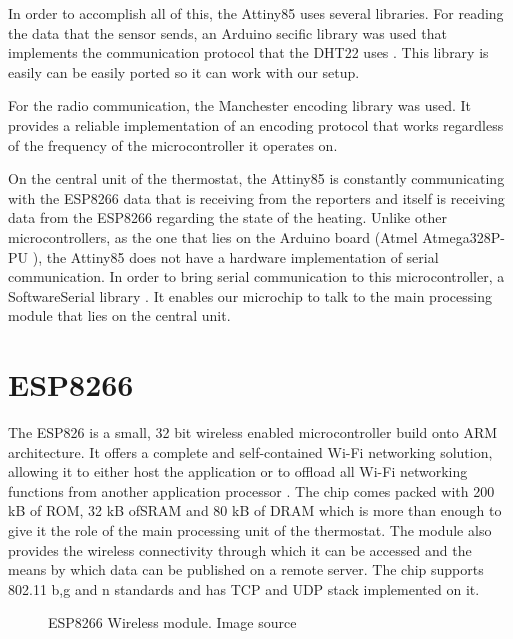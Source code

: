 In order to accomplish all of this, the Attiny85 uses several libraries.
For reading the data that the sensor sends, an Arduino secific library was used that implements the
communication protocol that the DHT22 uses \cite{website:dht22_library}. This library is easily can be easily
ported so it can work with our setup.

For the radio communication, the Manchester encoding library \cite{website:manchester} was used. It provides
a reliable implementation of an encoding protocol that works regardless of the frequency of the
microcontroller it operates on.

On the central unit of the thermostat, the Attiny85 is constantly communicating with the ESP8266 data that is
receiving from the reporters and itself is receiving data from the ESP8266 regarding the state of the heating.
Unlike other microcontrollers, as the one that lies on the Arduino board (Atmel Atmega328P-PU
\cite{datasheet:atmega328}), the Attiny85 does not have a hardware implementation of serial communication. In
order to bring serial communication to this microcontroller, a SoftwareSerial library
\cite{website:softserial}. It enables our microchip to talk to the main processing module that lies on the
central unit.


\section{ESP8266}
\label{sec:esp8266}

The ESP826 is a small, 32 bit wireless enabled microcontroller build onto ARM architecture. It offers a
complete and self-contained Wi-Fi networking solution, allowing it to either host the application or to
offload all Wi-Fi networking functions from another application processor \cite{website:espressifdesc}.
The chip comes packed with 200 kB of ROM, 32 kB ofSRAM and 80 kB of DRAM which is more than enough to give it
the role of the main processing unit of the thermostat. The module also provides the wireless connectivity
through which it can be accessed and the means by which data can be published on a remote server. The chip
supports 802.11 b,g and n standards and has TCP and UDP stack implemented on it.

\begin{figure}[h!]
    \label{fig:esp8266}
    \centerline{}
    \caption[ESP8266 Wireless module]{ESP8266 Wireless module. Image source
                                      \cite{website:esppicture}}
    \label{fig:esp8266}
\end{figure}


